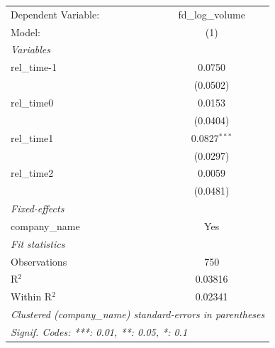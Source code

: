 
\begingroup
\centering
\begin{tabular}{lc}
   \tabularnewline \midrule \midrule
   Dependent Variable: & fd\_log\_volume\\    
   Model:              & (1)\\  
   \midrule
   \emph{Variables}\\
   rel\_time-1         & 0.0750\\   
                       & (0.0502)\\   
   rel\_time0          & 0.0153\\   
                       & (0.0404)\\   
   rel\_time1          & 0.0827$^{***}$\\   
                       & (0.0297)\\   
   rel\_time2          & 0.0059\\   
                       & (0.0481)\\   
   \midrule
   \emph{Fixed-effects}\\
   company\_name       & Yes\\  
   \midrule
   \emph{Fit statistics}\\
   Observations        & 750\\  
   R$^2$               & 0.03816\\  
   Within R$^2$        & 0.02341\\  
   \midrule \midrule
   \multicolumn{2}{l}{\emph{Clustered (company\_name) standard-errors in parentheses}}\\
   \multicolumn{2}{l}{\emph{Signif. Codes: ***: 0.01, **: 0.05, *: 0.1}}\\
\end{tabular}
\par\endgroup


